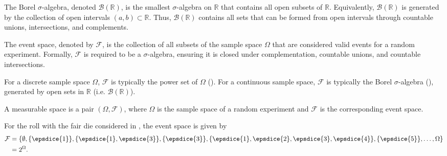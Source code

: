 \begin{definition}
	\label{def:borel_sigma_algebra}
	The Borel $\sigma$-algebra, denoted $\mathcal{B}(\mathbb{R})$, is the smallest $\sigma$-algebra on $\mathbb{R}$ that contains all open subsets of $\mathbb{R}$.  Equivalently, $\mathcal{B}(\mathbb{R})$ is generated by the collection of open intervals $(a,b) \subset \mathbb{R}$. Thus, $\mathcal{B}(\mathbb{R})$ contains all sets that can be formed from open intervals through countable unions, intersections, and complements.  
\end{definition}

\begin{definition}
	\label{def:event_space}
	The event space, denoted by $\mathcal{F}$, is the collection of all subsets of the sample space $\Omega$ that are considered valid events for a random experiment. Formally, $\mathcal{F}$ is required to be a $\sigma$-algebra, ensuring it is closed under complementation, countable unions, and countable intersections.
\end{definition}

\begin{remark}
	For a discrete sample space $\Omega$, $\mathcal{F}$ is typically the power set of $\Omega$ (). For a continuous sample space, $\mathcal{F}$ is typically the Borel $\sigma$-algebra (), generated by open sets in $\mathbb{R}$ (i.e. $\mathcal{B}(\mathbb{R})$).
\end{remark}

\begin{definition}
	\label{def:measurable_space}
	A measurable space is a pair $(\Omega, \mathcal{F})$, where $\Omega$ is the sample space of a random experiment and $\mathcal{F}$ is the corresponding event space.
\end{definition}

\begin{example}
	\label{ex:die2}
	For the roll with the fair die considered in , the event space is given by
	\begin{equation}
		\begin{split}
			\mathcal{F}&=\{\emptyset, \{\epsdice{1}\},\{\epsdice{1},\epsdice{3}\},\{\epsdice{3}\},\{\epsdice{1},\epsdice{2},\epsdice{3},\epsdice{4}\},\{\epsdice{5}\},\dots,\Omega\}\\
			& = 2^\Omega.
		\end{split}
	\end{equation}
\end{example}

